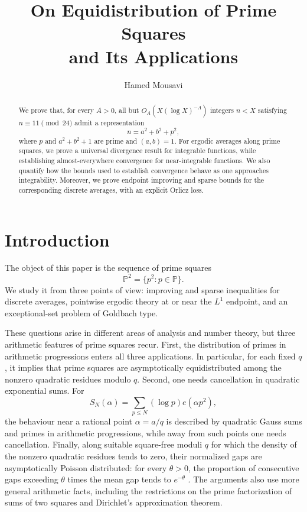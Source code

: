 \documentclass[12pt,reqno]{amsart}
\title[Prime Squares and Their Applications]
{On Equidistribution of Prime Squares \\ and Its Applications}
\author[H. Mousavi]{Hamed Mousavi}
\date{}
\numberwithin{equation}{section}
\theoremstyle{definition}
\theoremstyle{remark}
\begin{document}
\begin{abstract}
We prove that, for every \(A>0\), all but
\(O_A(X(\log X)^{-A})\) integers \(n<X\) satisfying
\(n\equiv11\pmod{24}\) admit a representation
\[
 n=a^2+b^2+p^2,
\]
where \(p\) and \(a^2+b^2+1\) are prime and \((a,b)=1\).
For ergodic averages along prime squares, we prove a universal
divergence result for integrable functions, while establishing
almost-everywhere convergence for near-integrable functions.
We also quantify how the bounds used to establish convergence behave as one approaches integrability. Moreover, we  prove endpoint improving and sparse bounds for
the corresponding discrete averages, with an explicit Orlicz loss.
\end{abstract}

\maketitle
\tableofcontents




\section{Introduction}\label{s:intro}





The object of this paper is the sequence of prime squares
\[
 \mathbb P^2=\{p^2:p\in\mathbb P\}.
\]
We study it from three points of view: improving and sparse inequalities
for discrete averages, pointwise ergodic theory at or near the $L^1$ endpoint,
and an exceptional-set problem of Goldbach type.


These questions arise in different areas of analysis and number theory,
but three arithmetic features of prime squares recur.  First, the
distribution of primes in arithmetic progressions enters all three
applications.  In particular, for each fixed \(q\), it implies that
prime squares are asymptotically equidistributed among the nonzero
quadratic residues modulo \(q\).  Second, one needs cancellation in
quadratic exponential sums.  For
\[
 S_N(\alpha)=\sum_{p\leq N}(\log p)e(\alpha p^2),
\]
the behaviour near a rational point \(\alpha=a/q\) is described by
quadratic Gauss sums and primes in arithmetic progressions, while away
from such points one needs cancellation.  Finally, along suitable square-free moduli \(q\) for which the density
of the nonzero quadratic residues tends to zero, their normalized gaps
are asymptotically Poisson distributed: for every \(\theta>0\), the
proportion of consecutive gaps exceeding \(\theta\) times the mean gap
tends to \(e^{-\theta}\) \cite{GK08}.    The arguments also use more general arithmetic facts, including
the restrictions on the prime factorization of sums of two squares
and Dirichlet's approximation theorem.
\end{document}
